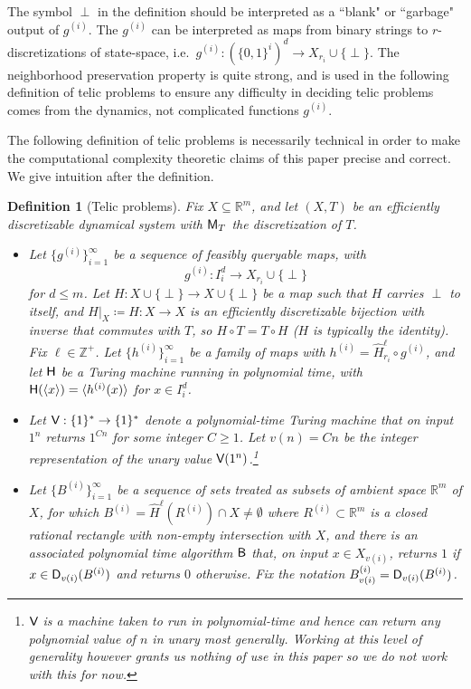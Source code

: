 \documentclass{amsart}
\theoremstyle{theorem}
\newtheorem{definition}[theorem]{Definition}
\theoremstyle{remark}
\numberwithin{equation}{section}
\newcommand{\RR}{\mathbb{R}}
\newcommand{\ZZ}{\mathbb{Z}}
\newcommand{\ccB}{\textsf{\upshape B}}
\newcommand{\ccD}{\textsf{\upshape D}}
\newcommand{\ccH}{\textsf{\upshape H}}
\newcommand{\ccM}{\textsf{\upshape M}}
\newcommand{\ccV}{\textsf{\upshape V}}
\begin{document}
The symbol $\perp$ in the definition should be interpreted as a ``blank" or ``garbage" output of $g^{(i)}$. The $g^{(i)}$ can be interpreted as maps from binary strings to $r$-discretizations of state-space, i.e.\ $g^{(i)}:(\{0,1\}^i)^d \rightarrow X_{r_i} \cup \{\perp\}$.
The neighborhood preservation property is quite strong, and is used in the following definition of telic problems to ensure any difficulty in deciding telic problems comes from the dynamics, not complicated functions $g^{(i)}$.

The following definition of telic problems is necessarily technical in order to make the computational complexity theoretic claims of this paper precise and correct. We give intuition after the definition.

\begin{definition}[Telic problems]\label{deftelic}%
Fix $X \subseteq \RR^m$, and let $(X, T)$ be an efficiently discretizable dynamical system with $\ccM_T$ the discretization of $T$.
\begin{itemize} 
\item Let $\{g^{(i)}\}_{i=1}^\infty$ be a sequence of feasibly queryable maps, with
\[
g^{(i)}: I_i^d \rightarrow X_{r_i} \cup \{\perp\}
\]
for $d \leq m$.
Let $H:X\cup\{\perp\}\rightarrow X\cup\{\perp\}$ be a map such that $H$ carries $\perp$ to itself, and $H|_X\coloneqq \hat{H}:X\rightarrow X$ is an efficiently discretizable bijection with inverse that commutes with $T$, so $H\circ T = T \circ H$ ($H$ is typically the identity).
Fix $\ell \in \ZZ^+$.
Let $\{h^{(i)}\}_{i=1}^\infty$ be a family of maps with $h^{(i)} = \hat{H}_{r_i}^{\ell}\circ g^{(i)}$, and let $\ccH$ be a Turing machine running in polynomial time, with $\ccH(\langle x\rangle) = \langle h^{(i)}(x)\rangle$ for $x \in I_i^d$.

\item Let $\ccV:\{1\}^*\rightarrow \{1\}^*$ denote a polynomial-time Turing machine that on input $1^n$ returns $1^{Cn}$ for some integer $C\geq 1$.
Let $v(n)=Cn$ be the integer representation of the unary value $\ccV(1^n)$.\footnote{$\ccV$ is a machine taken to run in polynomial-time and hence can return any polynomial value of $n$ in unary most generally. Working at this level of generality however grants us nothing of use in this paper so we do not work with this for now.}

\item Let $\{B^{(i)}\}_{i=1}^\infty$ be a sequence of sets treated as subsets of ambient space $\RR^m$ of $X$, for which $B^{(i)} = \hat{H}^{\ell}(R^{(i)})\cap X\neq \emptyset$ where $R^{(i)}\subset \RR^m$ is a closed rational rectangle with non-empty intersection with $X$, and there is an associated polynomial time algorithm $\ccB$ that, on input $x \in X_{v(i)}$, returns $1$ if $x \in\ccD_{v(i)}(B^{(i)})$ and returns $0$ otherwise. Fix the notation $B^{(i)}_{v(i)} = \ccD_{v(i)}(B^{(i)})$.
\end{itemize}


\end{definition}
\end{document}
